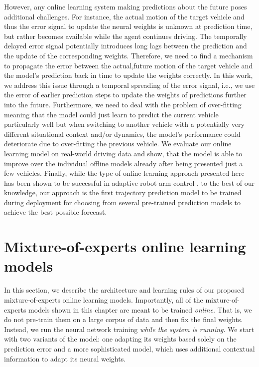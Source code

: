 However, any online learning system making predictions about the future poses additional challenges.
For instance, the actual motion of the target vehicle and thus the error signal to update the neural weights is unknown at prediction time, but rather becomes available while the agent continues driving.
The temporally delayed error signal potentially introduces long lags between the prediction and the update of the corresponding weights.
Therefore, we need to find a mechanism to propagate the error between the actual,future motion of the target vehicle and the model's prediction back in time to update the weights correctly.
In this work, we address this issue through a temporal spreading of the error signal, i.e., we use the error of earlier prediction steps to update the weights of predictions further into the future.
Furthermore, we need to deal with the problem of over-fitting meaning that the model could just learn to predict the current vehicle particularly well but when switching to another vehicle with a potentially very different situational context and/or dynamics, the model's performance could deteriorate due to over-fitting the previous vehicle.
We evaluate our online learning model on real-world driving data and show, that the model is able to improve over the individual offline models already after being presented just a few vehicles.
Finally, while the type of online learning approach presented here has been shown to be successful in adaptive robot arm control \parencite{DeWolf2016}, to the best of our knowledge, our approach is the first trajectory prediction model to be trained during deployment for choosing from several pre-trained prediction models to achieve the best possible forecast.  


\section{Mixture-of-experts online learning models}%
\label{sec:instantiating_mixture_of_experts_online_learning_models}

In this section, we describe the architecture and learning rules of our proposed mixture-of-experts online learning models.
Importantly, all of the mixture-of-experts models shown in this chapter are meant to be trained \emph{online}.
That is, we do not pre-train them on a large corpus of data and then fix the final weights.
Instead, we run the neural network training \emph{while the system is running}.
We start with two variants of the model: one adapting its weights based solely on the prediction error and a more sophisticated model, which uses additional contextual information to adapt its neural weights.

